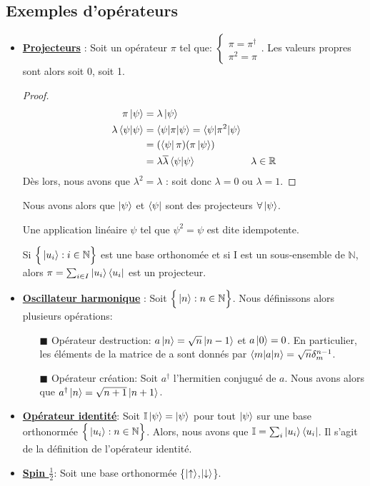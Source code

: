 \documentclass[../notesdecours.tex]{subfiles}
\begin{document}
\subsection{Exemples d'opérateurs}
\begin{itemize}
\item \underline{\textbf{Projecteurs}} : Soit un opérateur $\pi$ tel que: $\begin{cases} 
\pi = \pi^\dag\\
\pi^2 = \pi
\end{cases}$. Les valeurs propres sont alors soit 0, soit 1.
\begin{proof}
\begin{align*}
\pi\ket{\psi} &= \lambda\ket{\psi}\\
\lambda\braket{\psi|\psi} &= \braket{\psi|\pi|\psi} = \braket{\psi|\pi^2|\psi}\\
&= (\bra{\psi}\pi)(\pi\ket{\psi})\\
&= \lambda \overline{\lambda} \braket{\psi|\psi}		&\lambda\in\mathbb{R}\\
\end{align*}
Dès lors, nous avons que $\lambda^2 = \lambda$ : soit donc $\lambda = 0$ ou $\lambda = 1$.
\end{proof}

Nous avons alors que $\ket{\psi}$ et $\bra{\psi}$ sont des projecteurs $\forall\ket{\psi}$.\\

\begin{remark}
Une application linéaire $\psi$ tel que $\psi^2 = \psi$ est dite idempotente. \end{remark}

\begin{definition} Si $\Big\{\ket{u_i}: i\in\mathbb{N} \Big\}$ est une base orthonomée et si I est un sous-ensemble de $\mathbb{N}$, alors $\pi = \sum_{i\in I} \ket{u_i}\bra{u_i}$ est un projecteur. \end{definition}

\item \underline{\textbf{Oscillateur harmonique}} : Soit $\Big\{\ket{n}: n\in\mathbb{N} \Big\}$. Nous définissons alors plusieurs opérations:
	\begin{itemize}
	\item[$\blacksquare$] Opérateur destruction: $a\ket{n} = \sqrt{n}\ket{n-1}$ et $a\ket{0} = 0$. En particulier, les éléments de la matrice de a sont donnés par $\braket{m|a|n} = \sqrt{n}\delta_{m}^{n-1}$.
	\item[$\blacksquare$] Opérateur création: Soit $a^\dag$ l'hermitien conjugué de $a$. Nous avons alors que $a^\dag\ket{n} = \sqrt{n+1}\ket{n+1}$.
	\end{itemize}
\item \underline{\textbf{Opérateur identité}}: Soit $\mathbb{I}\ket{\psi} = \ket{\psi}$ pour tout $\ket{\psi}$ sur une base orthonormée $\Big\{\ket{u_i}: n\in\mathbb{N} \Big\}$. Alors, nous avons que $\mathbb{I} = \sum_i \ket{u_i}\bra{u_i}$. Il s'agit de la définition de l'opérateur identité.
\item \underline{\textbf{Spin $\frac{1}{2}$}}: Soit une base orthonormée \bigg\{$\ket{\uparrow}$,$\ket{\downarrow}$\bigg\}.
\end{itemize}
\end{document}

